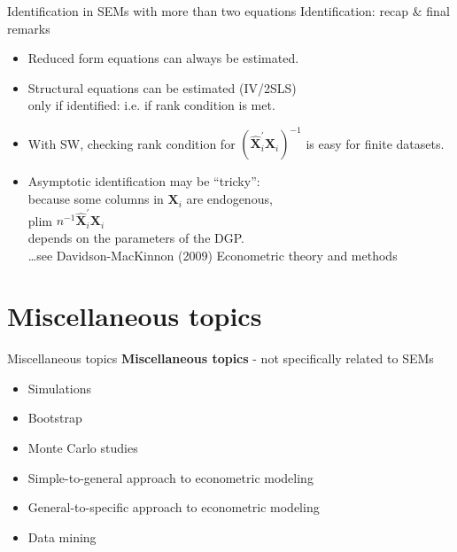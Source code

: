 \documentclass[usenames,dvipsnames]{beamer}
\begin{document}
\begin{frame}{Identification in SEMs with more than two equations}
Identification: recap \& final remarks\\
\bigskip
\begin{itemize}
\item Reduced form equations can always be estimated.\\
\smallskip
\item Structural equations can be estimated (IV/2SLS) \\only if identified: i.e. if rank condition is met.\\
\bigskip
\item With SW, checking rank condition for $\left(\hat{\bm{X}}^{\prime}_i \bm{X}_i \right)^{-1}$ is easy for finite datasets.\\
\smallskip
\item Asymptotic identification may be ``tricky'': \\because some columns in $\bm{X}_i$ are endogenous,\\
\smallskip
plim $n^{-1} \hat{\bm{X}}^{\prime}_i \bm{X}_i$ ~~ \\
\smallskip 
depends on the parameters of the DGP.\\
\medskip
\footnotesize{\dots see Davidson-MacKinnon (2009) Econometric theory and methods}
\end{itemize}
\end{frame}
\section{Miscellaneous topics}
\begin{frame}{Miscellaneous topics}
\textbf{Miscellaneous topics} - not specifically  related to SEMs\\
\medskip
\begin{itemize}
\item Simulations 
\item Bootstrap
\item Monte Carlo studies
\bigskip
\item Simple-to-general approach to econometric modeling
\item General-to-specific approach to econometric modeling\\
\bigskip
\item Data mining
\end{itemize}
\end{frame}
\end{document}
